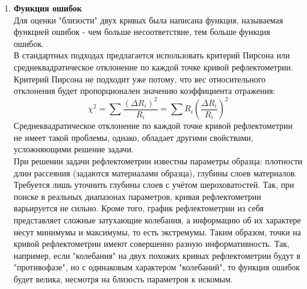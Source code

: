 \documentclass[a4paper]{article}
\begin{document}
\begin{enumerate}
Таким образом, получается минимальный набор точек, необходимый для работы свёртки над моделируемой выборкой измерений.

\subsection{Решение обратной задачи}
Основная сложность в задаче рефлектометрии - это решение обратной задачи рассеяния, поскольку она не имеет решения в общем виде.\\
Необходимо подобрать параметры образца так, чтобы данная (экспериментальная) и моделируемая кривые рефлектометрии совпали, или хотя бы были максимально близки друг к другу.
\item \textbf{Функция ошибок}\\ %
Для оценки "близости" двух кривых была написана функция, называемая функцией ошибок - чем больше несоответствие, тем больше функция ошибок.\\
В стандартных подходах предлагается использовать критерий Пирсона или среднеквадратическое отклонение по каждой точке кривой рефлектометрии. Критерий Пирсона не подходит уже потому, что вес относительного отклонения будет пропорционален значению коэффициента отражения: 
\begin{equation}
    \chi^2 =\sum{\frac{(\Delta R_i)^2}{R_i}}= \sum{R_i\left(\frac{\Delta R_i}{R_i}\right)^2} %
\end{equation}
Среднеквадратическое отклонение по каждой точке кривой рефлектометрии не имеет такой проблемы, однако, обладает другими свойствами, усложняющими решение задачи.\\
При решении задачи рефлектометрии известны параметры образца: плотности длин рассеяния (задаются материалами образца), глубины слоев материалов. Требуется лишь уточнить глубины слоев с учётом шероховатостей. Так, при поиске в реальных диапазонах параметров, кривая рефлектометрии варьируется не сильно. 
Кроме того, график рефлектометрии из себя представляет сложные затухающие колебания, а информацию об их характере несут минимумы и максимумы, то есть экстремумы. Таким образом, точки на кривой рефлектометрии имеют совершенно разную информативность. Так, например, если "колебания" на двух похожих кривых рефлектометрии будут в "противофазе", но с одинаковым характером "колебаний", то функция ошибок будет велика, несмотря на близость параметров к искомым.\\

\end{enumerate}
\end{document}
